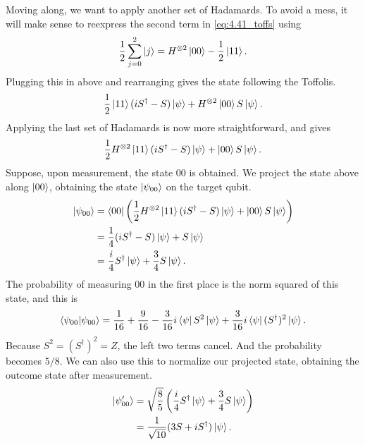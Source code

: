 \documentclass{book}
\begin{document}
    Moving along, we want to apply another set of Hadamards. To avoid a mess, it will make sense to reexpress the second term in \eqref{eq:4.41_toffs} using
    \begin{align}
        \frac{1}{2}\sum_{j=0}^2 \ket{j} = H^{\otimes 2} \ket{00} - \frac{1}{2}\ket{11}.
    \end{align}
    Plugging this in above and rearranging gives the state following the Toffolis.
    \begin{align}
        \frac{1}{2}\ket{11}(i S^\dagger - S) \ket{\psi} + H^{\otimes 2} \ket{00} S\ket{\psi}.
    \end{align}
    Applying the last set of Hadamards is now more straightforward, and gives
    \begin{align}
        \frac{1}{2}H^{\otimes 2}\ket{11}(i S^\dagger - S) \ket{\psi} + \ket{00}S\ket{\psi}.
    \end{align}
    Suppose, upon measurement, the state $00$ is obtained. We project the state above along $\ket{00}$, obtaining the state $\ket{\psi_{00}}$ on the target qubit.
    \begin{align}
    \begin{aligned}
        \ket{\psi_{00}} &= \bra{00}\left(\frac{1}{2}H^{\otimes 2}\ket{11}(i S^\dagger - S) \ket{\psi} + \ket{00}S\ket{\psi}\right) \\
        &= \frac{1}{4} (i S^\dagger - S) \ket{\psi} + S \ket{\psi} \\
        &= \frac{i}{4} S^\dagger \ket{\psi} + \frac{3}{4}S\ket{\psi}.
    \end{aligned}
    \end{align}
    The probability of measuring $00$ in the first place is the norm squared of this state, and this is
    \begin{align}
        \bra{\psi_{00}}\ket{\psi_{00}} = \frac{1}{16} + \frac{9}{16} - \frac{3}{16} i \bra{\psi}S^2 \ket{\psi} + \frac{3}{16}i\bra{\psi}(S^\dagger)^2 \ket{\psi}.
    \end{align}
    Because $S^2 = (S^\dagger)^2 = Z$, the left two terms cancel. And the probability becomes $5/8$. We can also use this to normalize our projected state, obtaining the outcome state after measurement.
    \begin{align}
    \begin{aligned}
        \ket{\psi_{00}'} &= \sqrt{\frac{8}{5}}\left(\frac{i}{4}S^\dagger \ket{\psi} + \frac{3}{4}S\ket{\psi}\right) \\
        &= \frac{1}{\sqrt{10}}(3 S + i S^\dagger)\ket{\psi}.
    \end{aligned}
    \end{align}
\end{document}
